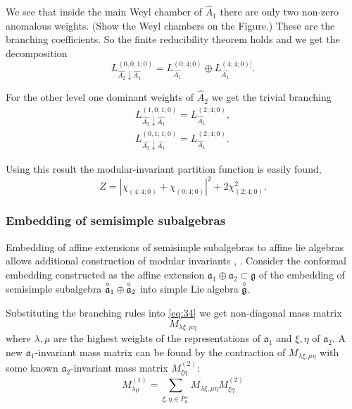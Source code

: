 \documentclass[a4paper,12pt]{article}
\theoremstyle{definition} \newtheorem{Def}{Definition}
\newcommand{\go}{\overset{\circ }{\frak{g}}}
\newcommand{\ao}{\overset{\circ }{\frak{a}}}
\begin{document}
We see that inside the main Weyl chamber of $\hat{A}_1$ there are only two non-zero anomalous weights. (Show the Weyl chambers on the Figure.) These are the branching coefficients. So the finite reducibility theorem holds and we get the decomposition
\begin{equation}
  \label{eq:43}
  L^{(0,0;1;0)}_{\hat{A_2}\downarrow \hat{A_1}}= L_{\hat{A_1}}^{(0;4;0)}\oplus L_{\hat{A_1}}^{(4;4;0)]}.
\end{equation}

For the other level one dominant weights of $\hat{A}_2$ we get the trivial
branching 
\begin{eqnarray}
  \label{eq:44}
   L^{(1,0;1;0)}_{\hat{A_2}\downarrow \hat{A_1}}= L_{\hat{A_1}}^{(2;4;0)},\\
   L^{(0,1;1;0)}_{\hat{A_2}\downarrow \hat{A_1}}= L_{\hat{A_1}}^{(2;4;0)}.
\end{eqnarray}

Using this result the modular-invariant partition function is easily found,
\begin{equation}
  \label{eq:45}
  Z=\left|\chi_{(4;4;0)}+\chi_{(0;4;0)}\right|^2+2\chi_{(2;4;0)}^2.
\end{equation}

\subsubsection{Embedding of semisimple subalgebras}
\label{sec:embedd-semis-subalg}

Embedding of affine extensions of semisimple subalgebras to affine lie algebras allows additional construction of modular invariants \cite{difrancesco1997cft}, \cite{walton1989conformal}. Consider the conformal embedding constructed as the affine extension  $\mathfrak{a}_{1}\oplus\mathfrak{a}_{2}\subset \mathfrak{g}$ of the embedding of semisimple subalgebra $\ao_1\oplus\ao_2$ into simple Lie algebra $\go$.

Substituting the branching rules into \eqref{eq:34} we get non-diagonal mass matrix
\begin{equation}
  \label{eq:2}
  M_{\lambda\xi,\mu\eta}
\end{equation}
where $\lambda,\mu$ are the highest weights of the representations of $\mathfrak{a}_1$ and $\xi,\eta$ of $\mathfrak{a}_2$. A new $\mathfrak{a}_1$-invariant mass matrix can be found by the contraction of $M_{\lambda\xi,\mu\eta}$ with some known $\mathfrak{a}_2$-invariant mass matrix $M^{(2)}_{\xi\eta}$:
\begin{equation}
  \label{eq:35}
  M^{(1)}_{\lambda\mu}=\sum_{\xi,\eta\in P_{\mathfrak{a}}^{+}}M_{\lambda\xi,\mu\eta}M^{(2)}_{\xi\eta}
\end{equation}
\end{document}
